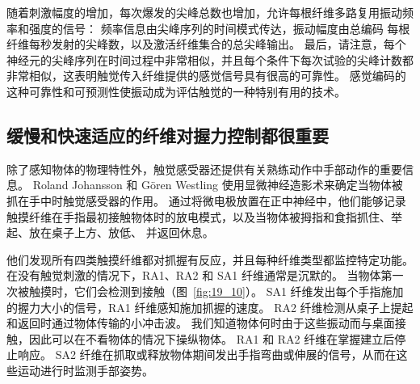 随着刺激幅度的增加，每次爆发的尖峰总数也增加，允许每根纤维多路复用振动频率和强度的信号：
频率信息由尖峰序列的时间模式传达，振动幅度由总编码 每根纤维每秒发射的尖峰数，以及激活纤维集合的总尖峰输出。
最后，请注意，每个神经元的尖峰序列在时间过程中非常相似，并且每个条件下每次试验的尖峰计数都非常相似，这表明触觉传入纤维提供的感觉信号具有很高的可靠性。 
感觉编码的这种可靠性和可预测性使振动成为评估触觉的一种特别有用的技术。



\subsection{缓慢和快速适应的纤维对握力控制都很重要}

除了感知物体的物理特性外，触觉感受器还提供有关熟练动作中手部动作的重要信息。
Roland Johansson 和 Gören Westling 使用显微神经造影术来确定当物体被抓在手中时触觉感受器的作用。
通过将微电极放置在正中神经中，他们能够记录触摸纤维在手指最初接触物体时的放电模式，以及当物体被拇指和食指抓住、举起、放在桌子上方、放低、 并返回休息。


他们发现所有四类触摸纤维都对抓握有反应，并且每种纤维类型都监控特定功能。
在没有触觉刺激的情况下，RA1、RA2 和 SA1 纤维通常是沉默的。
当物体第一次被触摸时，它们会检测到接触（图~\ref{fig:19_10}）。
SA1 纤维发出每个手指施加的握力大小的信号，RA1 纤维感知施加抓握的速度。
RA2 纤维检测从桌子上提起和返回时通过物体传输的小冲击波。
我们知道物体何时由于这些振动而与桌面接触，因此可以在不看物体的情况下操纵物体。
RA1 和 RA2 纤维在掌握建立后停止响应。
SA2 纤维在抓取或释放物体期间发出手指弯曲或伸展的信号，从而在这些运动进行时监测手部姿势。


